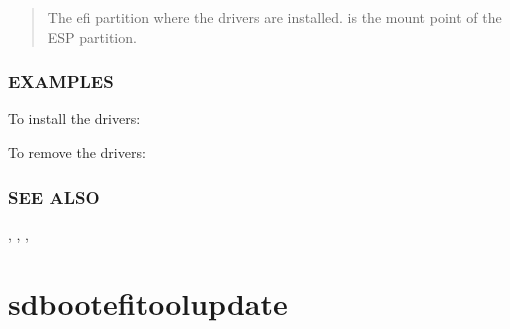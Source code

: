 \documentclass[letterpaper,11pt,english]{sphinxmanual}
\begin{document}
\sphinxAtStartPar
{}
\begin{quote}

\sphinxAtStartPar
The efi partition where the drivers are installed.  is the mount point of the
ESP partition.
\end{quote}


\subsubsection{EXAMPLES}
\label{\detokenize{_build/man-ready/sd-boot-efifs-update.8:examples}}
\sphinxAtStartPar
To install the drivers:

\begin{sphinxVerbatim}[commandchars=\\\{\}]
\end{sphinxVerbatim}

\sphinxAtStartPar
To remove the drivers:

\begin{sphinxVerbatim}[commandchars=\\\{\}]
\end{sphinxVerbatim}


\subsubsection{SEE ALSO}
\label{\detokenize{_build/man-ready/sd-boot-efifs-update.8:see-also}}
\sphinxAtStartPar
{}, , ,

\sphinxstepscope


\section{sd\sphinxhyphen{}boot\sphinxhyphen{}efi\sphinxhyphen{}tool\sphinxhyphen{}update}
\label{\detokenize{_build/man-ready/sd-boot-efi-tool-update.8:sd-boot-efi-tool-update}}\label{\detokenize{_build/man-ready/sd-boot-efi-tool-update.8::doc}}
\end{document}
